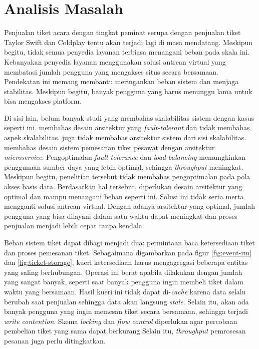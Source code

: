 \section{Analisis Masalah}

Penjualan tiket acara dengan tingkat peminat serupa dengan penjualan tiket Taylor Swift dan Coldplay tentu akan terjadi lagi di masa mendatang. Meskipun begitu, tidak semua penyedia layanan terbiasa menangani beban pada skala ini. Kebanyakan penyedia layanan menggunakan solusi antrean virtual yang membatasi jumlah pengguna yang mengakses situs secara bersamaan. Pendekatan ini memang membantu meringankan beban sistem dan menjaga stabilitas. Meskipun begitu, banyak pengguna yang harus menunggu lama untuk bisa mengakses platform.

Di sisi lain, belum banyak studi yang membahas skalabilitas sistem dengan kasus seperti ini. \cite{microservicesEventDriven} membahas desain arsitektur yang \textit{fault-tolerant} dan tidak membahas aspek skalabilitas. \cite{backendForTicketing} juga tidak membahas arsitektur sistem dari sisi skalabilitas. \cite{barua2024enhancingresiliencescalabilitytravel} membahas desain sistem pemesanan tiket pesawat dengan arsitektur \textit{microservice}. Pengoptimalan \textit{fault tolerance} dan \textit{load balancing} memungkinkan penggunaan sumber daya yang lebih optimal, sehingga \textit{throughput} meningkat. Meskipun begitu, penelitian tersebut tidak membahas pengoptimalan pada pola akses basis data. Berdasarkan hal tersebut, diperlukan desain arsitektur yang optimal dan mampu menangani beban seperti ini. Solusi ini tidak serta merta mengganti solusi antrean virtual. Dengan adanya arsitektur yang optimal, jumlah pengguna yang bisa dilayani dalam satu waktu dapat meningkat dan proses penjualan menjadi lebih cepat tanpa kendala.

Beban sistem tiket dapat dibagi menjadi dua: permintaan baca ketersediaan tiket dan proses pemesanan tiket. Sebagaimana digambarkan pada figur \ref{fig:event-rm} dan \ref{fig:ticket-storage}, kueri ketersediaan harus mengagregasi beberapa entitas yang saling berhubungan. Operasi ini berat apabila dilakukan dengan jumlah yang sangat banyak, seperti saat banyak pengguna ingin membeli tiket dalam waktu yang bersamaan. Hasil kueri ini tidak dapat di-\textit{cache} karena data selalu berubah saat penjualan sehingga data akan langsung \textit{stale}. Selain itu, akan ada banyak pengguna yang ingin memesan tiket secara bersamaan, sehingga terjadi \textit{write contention}. Skema \textit{locking} dan \textit{flow control} diperlukan agar percobaan pembelian tiket yang sama dapat berkurang Selain itu, \textit{throughput} pemrosesan pesanan juga perlu ditingkatkan.